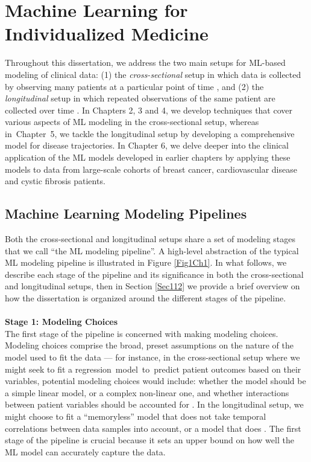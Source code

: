 \documentclass [PhD] {uclathes}
\begin{document}
\section{Machine Learning for Individualized Medicine}
\label{Sec11}
Throughout this dissertation, we address the two main setups for ML-based modeling of clinical data: (1) the \textit{cross-sectional} setup in which data is collected by observing many patients at a particular point of time \cite{levin2006study}, and (2) the \textit{longitudinal} setup in which repeated observations of the same patient are collected over time \cite{kelloway2013longitudinal}. In Chapters 2, 3 and 4, we develop techniques that cover various aspects of ML modeling in the cross-sectional setup, whereas in~Chapter~5, we tackle the longitudinal setup by developing a comprehensive model for disease trajectories. In Chapter 6, we delve deeper into the clinical application of the ML models developed in earlier chapters by applying these models to data from large-scale cohorts of breast cancer, cardiovascular disease and cystic fibrosis patients.

\subsection{Machine Learning Modeling Pipelines}
Both the cross-sectional and longitudinal setups share a set of modeling stages that we call ``the ML modeling pipeline''. A high-level abstraction of the typical ML modeling pipeline is illustrated in Figure \ref{Fig1Ch1}. In what follows, we describe each stage of the pipeline and its significance in both the cross-sectional and longitudinal setups, then in Section \ref{Sec112} we provide a brief overview on how the dissertation is organized around the different stages of the pipeline.\\   
\\
\textbf{Stage 1: Modeling Choices}\\
The first stage of the pipeline is concerned with making modeling choices. Modeling choices comprise the broad, preset assumptions on the nature of the model used to fit the data --- for instance, in the cross-sectional setup where we might seek to fit a regression~model~to~predict patient outcomes based on their variables, potential modeling choices would include: whether the model should be a simple linear model, or a complex non-linear one, and whether interactions between patient variables should be accounted for \cite{barros2003alternatives}. In the longitudinal setup, we might choose to fit a ``memoryless'' model that does not take temporal correlations between data samples into account, or a model that does \cite{murtagh2011trajectories}. The first stage of the pipeline is crucial because it sets an upper bound on how well the ML model can accurately capture the data.
\end{document}
